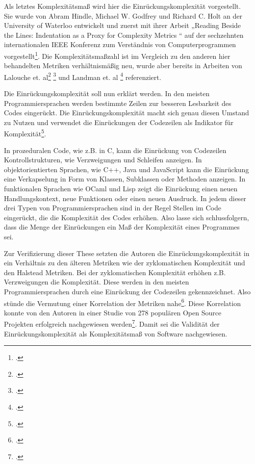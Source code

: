 Als letztes Komplexitätsmaß wird hier die Einrückungskomplexität
vorgestellt. Sie wurde von Abram Hindle, Michael W. Godfrey und Richard
C. Holt an der University of Waterloo entwickelt und zuerst mit ihrer
Arbeit „Reading Beside the Lines: Indentation as a Proxy for Complexity
Metrics `` auf der sechzehnten internationalen IEEE Konferenz zum
Verständnis von Computerprogrammen vorgestellt\footcite[Vgl. ][S. 1]{hindleReadingLinesIndentation2008}. Die Komplexitätsmaßzahl ist im Vergleich zu den anderen hier
behandelten Metriken verhältnismäßig neu, wurde aber bereits in Arbeiten
von Lalouche et. al\footcite[Vgl. ][S. 10]{gilWhenSoftwareComplexity2016}
\footcite[Vgl. ][S. 7]{gilCorrelationSizeMetric2017} und Landman et. al
\footcite[Vgl. ][S. 6]{landmanEmpiricalAnalysisRelationship2016} referenziert.

Die Einrückungskomplexität soll nun erklärt werden. In den meisten
Programmiersprachen werden bestimmte Zeilen zur besseren Lesbarkeit des
Codes eingerückt. Die Einrückungskomplexität macht sich genau diesen
Umstand zu Nutzen und verwendet die Einrückungen der Codezeilen als
Indikator für Komplexität\footcite[Vgl. ][S. 1]{hindleReadingLinesUsing2009}.

In prozeduralen Code, wie z.B. in C, kann die Einrückung von Codezeilen
Kontrollstrukturen, wie Verzweigungen und Schleifen anzeigen. In
objektorientierten Sprachen, wie C++, Java und JavaScript kann die
Einrückung eine Verkapselung in Form von Klassen, Subklassen oder
Methoden anzeigen. In funktionalen Sprachen wie OCaml und Lisp zeigt die
Einrückung einen neuen Handlungskontext, neue Funktionen oder einen
neuen Ausdruck. In jedem dieser drei Typen von
Programmiersprachen sind in der Regel Stellen im Code eingerückt, die
die Komplexität des Codes erhöhen. Also lasse sich schlussfolgern, dass
die Menge der Einrückungen ein Maß der Komplexität eines Programmes sei.

Zur Verifizierung dieser These setzten die Autoren die
Einrückungskomplexität in ein Verhältnis zu den älteren Metriken wie der
zyklomatischen Komplexität und den Halstead Metriken. Bei der
zyklomatischen Komplexität erhöhen z.B. Verzweigungen die Komplexität.
Diese werden in den meisten Programmiersprachen durch eine Einrückung
der Codezeilen gekennzeichnet. Also stünde die Vermutung einer
Korrelation der Metriken nahe\footcite[Vgl. ][S. 2]{hindleReadingLinesUsing2009}.
Diese Korrelation konnte von den Autoren in einer Studie von 278
populären Open Source Projekten erfolgreich nachgewiesen
werden\footcite[][]{hindleReadingLinesUsing2009}. Damit sei die Validität der
Einrückungskomplexität als Komplexitätsmaß von Software nachgewiesen.

